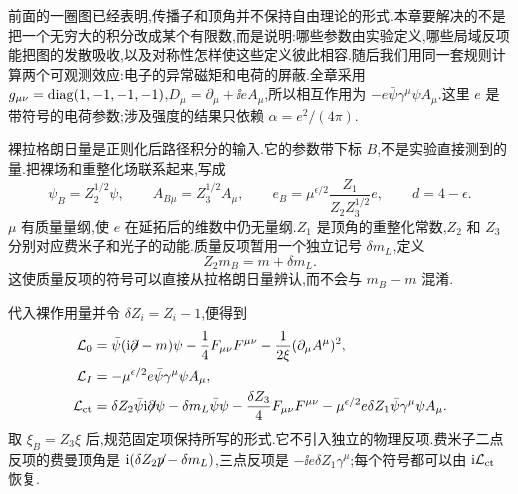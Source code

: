 \label{ch:qed-renormalization}

前面的一圈图已经表明,传播子和顶角并不保持自由理论的形式.本章要解决的不是把一个无穷大的积分改成某个有限数,而是说明:哪些参数由实验定义,哪些局域反项能把图的发散吸收,以及对称性怎样使这些定义彼此相容.随后我们用同一套规则计算两个可观测效应:电子的异常磁矩和电荷的屏蔽.全章采用 $g_{\mu\nu}=\operatorname{diag}(1,-1,-1,-1)$,$D_\mu=\partial_\mu+\ii eA_\mu$,所以相互作用为 $-e\bar\psi\gamma^\mu\psi A_\mu$.这里 $e$ 是带符号的电荷参数;涉及强度的结果只依赖 $\alpha=e^2/(4\pi)$.


裸拉格朗日量是正则化后路径积分的输入.它的参数带下标 $B$,不是实验直接测到的量.把裸场和重整化场联系起来,写成
\begin{equation}
 \psi_B=Z_2^{1/2}\psi,\qquad A_{B\mu}=Z_3^{1/2}A_\mu,
 \qquad e_B=\mu^{\epsilon/2}\frac{Z_1}{Z_2Z_3^{1/2}}e,
 \qquad d=4-\epsilon .
 \label{eq:qed-bare-ren}
\end{equation}
$\mu$ 有质量量纲,使 $e$ 在延拓后的维数中仍无量纲.$Z_1$ 是顶角的重整化常数,$Z_2$ 和 $Z_3$ 分别对应费米子和光子的动能.质量反项暂用一个独立记号 $\delta m_L$,定义
\begin{equation}
 Z_2m_B=m+\delta m_L .
 \label{eq:qed-mass-ct-definition}
\end{equation}
这使质量反项的符号可以直接从拉格朗日量辨认,而不会与 $m_B-m$ 混淆.

代入裸作用量并令 $\delta Z_i=Z_i-1$,便得到
\begin{align}
 \mathcal L_0&=\bar\psi(\mathrm i\mathord{\not\mathrel{\partial}}-m)\psi
              -\frac14F_{\mu\nu}F^{\mu\nu}
              -\frac1{2\xi}(\partial_\mu A^\mu)^2,\notag\\
 \mathcal L_I&=-\mu^{\epsilon/2}e\bar\psi\gamma^\mu\psi A_\mu,\notag\\
 \mathcal L_{\rm ct}&=\delta Z_2\bar\psi\mathrm i\mathord{\not\mathrel{\partial}}\psi
       -\delta m_L\bar\psi\psi
       -\frac{\delta Z_3}{4}F_{\mu\nu}F^{\mu\nu}
       -\mu^{\epsilon/2}e\delta Z_1\bar\psi\gamma^\mu\psi A_\mu .
 \label{eq:qed-ct-lagrangian}
\end{align}
取 $\xi_B=Z_3\xi$ 后,规范固定项保持所写的形式.它不引入独立的物理反项.费米子二点反项的费曼顶角是 $\mathrm i(\delta Z_2\mathord{\not\mathrel{p}}-\delta m_L)$,三点反项是 $-\ii e\delta Z_1\gamma^\mu$;每个符号都可以由 $\mathrm i\mathcal L_{\rm ct}$ 恢复.

